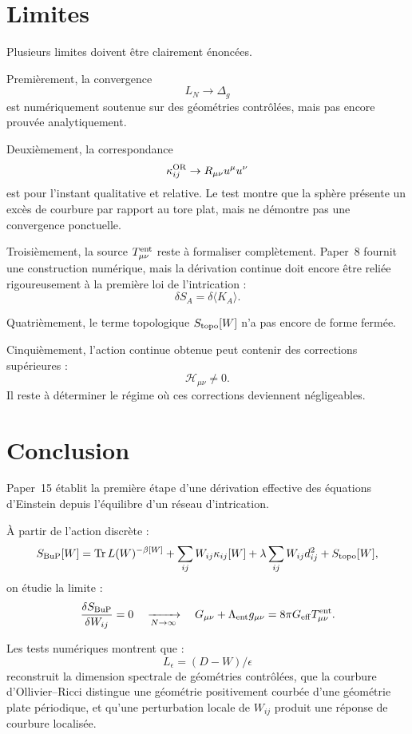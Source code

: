 \documentclass[11pt,a4paper]{article}
\begin{document}
\section{Limites}

Plusieurs limites doivent être clairement énoncées.

Premièrement, la convergence
\[
L_N\to\Delta_g
\]
est numériquement soutenue sur des géométries contrôlées, mais pas encore
prouvée analytiquement.

Deuxièmement, la correspondance
\[
\kappa_{ij}^{\rm OR}\to R_{\mu\nu}u^\mu u^\nu
\]
est pour l'instant qualitative et relative. Le test montre que la sphère
présente un excès de courbure par rapport au tore plat, mais ne démontre pas
une convergence ponctuelle.

Troisièmement, la source \(T_{\mu\nu}^{\rm ent}\) reste à formaliser
complètement. Paper~8 fournit une construction numérique, mais la dérivation
continue doit encore être reliée rigoureusement à la première loi de
l'intrication :
\[
\delta S_A=\delta\langle K_A\rangle.
\]

Quatrièmement, le terme topologique \(S_{\rm topo}[W]\) n'a pas encore de
forme fermée.

Cinquièmement, l'action continue obtenue peut contenir des corrections
supérieures :
\[
\mathcal{H}_{\mu\nu}\neq0.
\]
Il reste à déterminer le régime où ces corrections deviennent négligeables.

\section{Conclusion}

Paper~15 établit la première étape d'une dérivation effective des équations
d'Einstein depuis l'équilibre d'un réseau d'intrication.

À partir de l'action discrète :
\[
S_{\rm BuP}[W]
=
\mathrm{Tr}\,L(W)^{-\beta[W]}
+
\sum_{ij}W_{ij}\kappa_{ij}[W]
+
\lambda\sum_{ij}W_{ij}d_{ij}^{2}
+
S_{\rm topo}[W],
\]
on étudie la limite :
\[
\frac{\delta S_{\rm BuP}}{\delta W_{ij}}=0
\quad
\xrightarrow[N\to\infty]{}
\quad
G_{\mu\nu}
+
\Lambda_{\rm ent}g_{\mu\nu}
=
8\pi G_{\rm eff}T_{\mu\nu}^{\rm ent}.
\]

Les tests numériques montrent que :
\[
L_\epsilon=(D-W)/\epsilon
\]
reconstruit la dimension spectrale de géométries contrôlées, que la courbure
d'Ollivier--Ricci distingue une géométrie positivement courbée d'une
géométrie plate périodique, et qu'une perturbation locale de \(W_{ij}\)
produit une réponse de courbure localisée.
\end{document}
